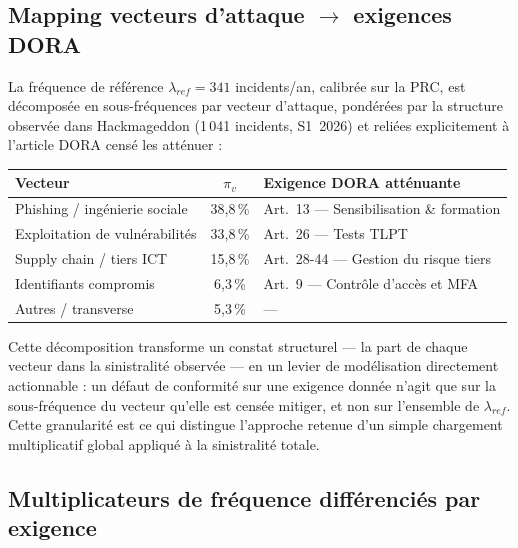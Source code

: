 \documentclass[11pt,a4paper]{article}
\theoremstyle{navystyle}
\theoremstyle{navydef}
\begin{document}
\subsection{Mapping vecteurs d'attaque $\rightarrow$ exigences DORA}

La fréquence de référence $\lambda_{ref} = 341$ incidents/an, calibrée sur la
PRC, est décomposée en sous-fréquences par vecteur d'attaque, pondérées par
la structure observée dans Hackmageddon (1\,041 incidents, S1~2026) et
reliées explicitement à l'article DORA censé les atténuer :

\begin{center}
\renewcommand{\arraystretch}{1.25}
\begin{tabular}{>{\raggedright}p{4.5cm} c >{\raggedright\arraybackslash}p{6cm}}
\toprule
\rowcolor{lightblue}
\textbf{Vecteur} & \textbf{$\pi_v$} & \textbf{Exigence DORA atténuante} \\
\midrule
Phishing / ingénierie sociale & 38{,}8\,\% & Art.~13 --- Sensibilisation \& formation \\
Exploitation de vulnérabilités & 33{,}8\,\% & Art.~26 --- Tests TLPT \\
Supply chain / tiers ICT & 15{,}8\,\% & Art.~28-44 --- Gestion du risque tiers \\
Identifiants compromis & 6{,}3\,\% & Art.~9 --- Contrôle d'accès et MFA \\
Autres / transverse & 5{,}3\,\% & --- \\
\bottomrule
\end{tabular}
\end{center}

Cette décomposition transforme un constat structurel --- la part de chaque
vecteur dans la sinistralité observée --- en un levier de modélisation
directement actionnable : un défaut de conformité sur une exigence donnée
n'agit que sur la sous-fréquence du vecteur qu'elle est censée mitiger, et
non sur l'ensemble de $\lambda_{ref}$. Cette granularité est ce qui distingue
l'approche retenue d'un simple chargement multiplicatif global appliqué à la
sinistralité totale.

\subsection{Multiplicateurs de fréquence différenciés par exigence}
\end{document}
